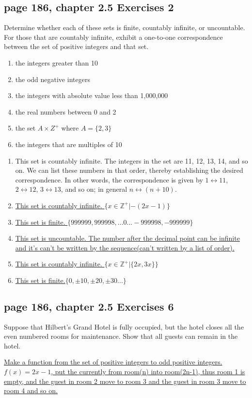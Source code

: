 \documentclass[sigconf]{acmart}
\begin{document}
\subsection{page 186, chapter 2.5 Exercises 2}
\begin{shaded}
    Determine whether each of these sets is finite, countably infinite, or uncountable. For those that are countably infinite, exhibit a one-to-one correspondence between the set of positive integers and that set.
    \begin{enumerate}[label=(\alph*)]
    	\item the integers greater than 10
    	\item the odd negative integers
    	\item the integers with absolute value less than 1,000,000
    	\item the real numbers between 0 and 2
            \item the set $A \times Z^+$ where $A = \{2, 3\}$
            \item the integers that are multiples of 10
    \end{enumerate}
\end{shaded}  
\begin{enumerate}[label=(\alph*)]
        \item This set is countably infinite. The integers in the set are 11, 12, 13, 14, and so on. We can list these numbers in that order, thereby establishing the desired correspondence. In other words, the correspondence is given by $1\leftrightarrow11$, $2\leftrightarrow12$, $3\leftrightarrow13$, and so on; in general $n\leftrightarrow(n + 10)$.
	\item \uline{This set is countably infinite. $\{x\in\mathbb{Z^+}|-(2x-1)\}$}
	\item \uline{This set is finite. $\{999999,999998,...0...-999998,-999999\}$}
	\item \uline{This set is uncountable. The number after the decimal point can be infinite and it's can't be written by the sequence(can't written by a list of order).}
 	\item \uline{This set is countably infinite. $\{x\in \mathbb{Z^+}|\{2x,3x\}\}$}
  	\item \uline{This set is finite.$\{0,\pm10,\pm20,\pm30...\}$}
\end{enumerate}

\subsection{page 186, chapter 2.5 Exercises 6}
\begin{shaded}
    Suppose that Hilbert’s Grand Hotel is fully occupied, but the hotel closes all the even numbered rooms for maintenance. Show that all guests can remain in the hotel.
\end{shaded}  
\uline{Make a function from the set of positive integers to odd positive integers.}
\uline{$f(x)=2x-1$, put the currently from room(n) into room(2n-1), thus room 1 is empty, and the guest in room 2 move to room 3 and the guest in room 3 move to room 4 and so on.}
\end{document}
